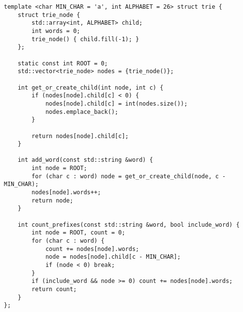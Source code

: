 \begin{lstlisting}
template <char MIN_CHAR = 'a', int ALPHABET = 26> struct trie {
	struct trie_node {
		std::array<int, ALPHABET> child;
		int words = 0;
		trie_node() { child.fill(-1); }
	};
	
	static const int ROOT = 0;
	std::vector<trie_node> nodes = {trie_node()};
	
	int get_or_create_child(int node, int c) {
		if (nodes[node].child[c] < 0) {
			nodes[node].child[c] = int(nodes.size());
			nodes.emplace_back();
		}
		
		return nodes[node].child[c];
	}
	
	int add_word(const std::string &word) {
		int node = ROOT;
		for (char c : word) node = get_or_create_child(node, c - MIN_CHAR);
		nodes[node].words++;
		return node;
	}
	
	int count_prefixes(const std::string &word, bool include_word) {
		int node = ROOT, count = 0;
		for (char c : word) {
			count += nodes[node].words;
			node = nodes[node].child[c - MIN_CHAR];
			if (node < 0) break;
		}
		if (include_word && node >= 0) count += nodes[node].words;
		return count;
	}
};
\end{lstlisting}